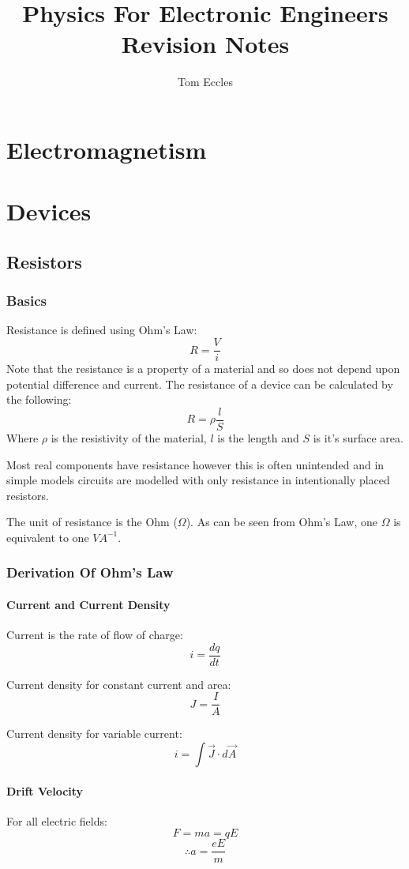 \documentclass[11pt,a4paper]{report}
\title{Physics For Electronic Engineers Revision Notes}
\author{Tom Eccles}
\begin{document}
\maketitle
\pagebreak
\tableofcontents
\pagebreak
\chapter{Electromagnetism}

\chapter{Devices}
\section{Resistors}
\subsection{Basics}
Resistance is defined using Ohm's Law:
\[R=\frac{V}{i}\] Note that the resistance is a property of a material and so does not depend upon potential difference and current. The resistance of a device can be calculated by the following:
\[R=\rho\frac{l}{S}\] Where $\rho$ is the resistivity of the material, $l$ is the length and $S$ is it's surface area.

Most real components have resistance however this is often unintended and in simple models circuits are modelled with only resistance in intentionally placed resistors.

The unit of resistance is the Ohm ($\Omega$). As can be seen from Ohm's Law, one $\Omega$ is equivalent to one $VA^{-1}$.

\subsection{Derivation Of Ohm's Law}
\subsubsection{Current and Current Density}
Current is the rate of flow of charge:
\[i=\frac{dq}{dt}\]

Current density for constant current and area: 
\[J = \frac{I}{A}\]

Current density for variable current: 
\[i = \int \vec{J} \cdot d\vec{A}\] 

\subsubsection{Drift Velocity}
For all electric fields:
\[F = ma = qE\]
\[\therefore a = \frac{eE}{m}\]
\end{document}
